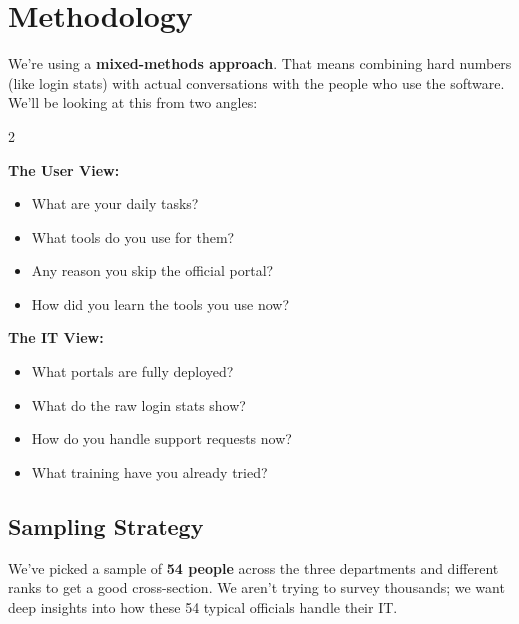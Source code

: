 \documentclass[11pt,a4paper]{article}
\begin{document}
\section{Methodology}

\vspace{0.2cm}

We’re using a \textbf{mixed-methods approach}. That means combining hard 
numbers (like login stats) with actual conversations with the people who 
use the software. We'll be looking at this from two angles:

\vspace{0.3cm}
\begin{multicols}{2}
\begin{streamboxa}
\small
\textbf{The User View:}
\begin{itemize}[leftmargin=1em,itemsep=3pt,topsep=2pt]
  \item What are your daily tasks?
  \item What tools do you use for them?
  \item Any reason you skip the official portal?
  \item How did you learn the tools you use now?
\end{itemize}
\end{streamboxa}

\columnbreak

\begin{streamboxb}
\small
\textbf{The IT View:}
\begin{itemize}[leftmargin=1em,itemsep=3pt,topsep=2pt]
  \item What portals are fully deployed?
  \item What do the raw login stats show?
  \item How do you handle support requests now?
  \item What training have you already tried?
\end{itemize}
\end{streamboxb}
\end{multicols}

\subsection{Sampling Strategy}

We’ve picked a sample of \textbf{54 people} across the three departments and 
different ranks to get a good cross-section. We aren't trying to survey 
thousands; we want deep insights into how these 54 typical officials 
handle their IT.
\end{document}
